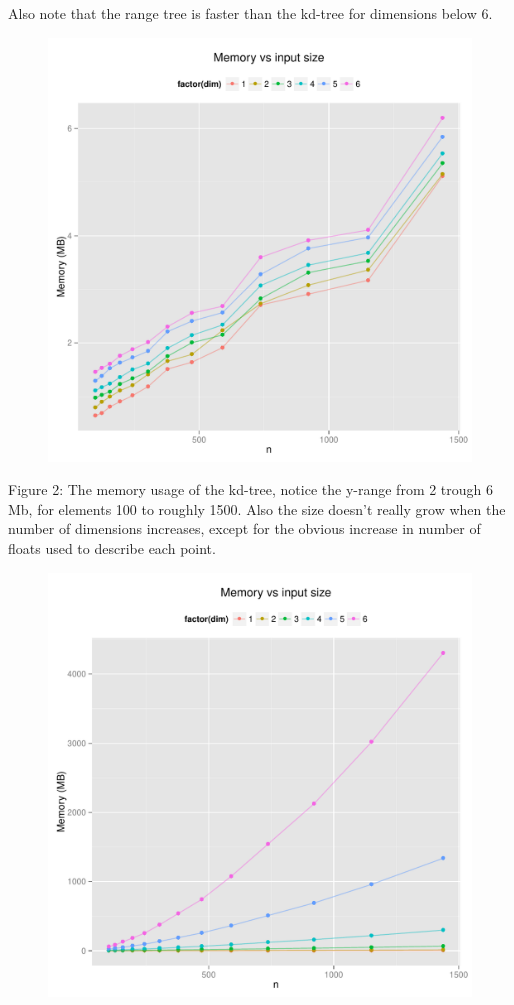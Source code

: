 \documentclass{article}
\begin{document}
Also note that the range tree is faster than the kd-tree for dimensions below 6.
\begin{figure}[H]
    \centering
    \includegraphics[width=\textwidth]{../src/R/plots/kdmem.pdf}
    \caption{}
\end{figure}
Figure 2: The memory usage of the kd-tree, notice the y-range from 2 trough 6 Mb, for elements 100 to roughly 1500. Also the size doesn't really grow
when the number of dimensions increases, except for the obvious increase in number of floats used to describe each point.
\begin{figure}[H]
    \centering
    \includegraphics[width=\textwidth]{../src/R/plots/rtmem.pdf}
    \caption{}
\end{figure}
\end{document}
